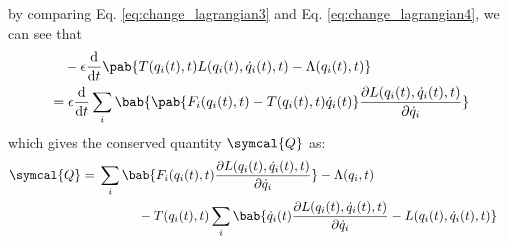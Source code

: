 by comparing Eq. \eqref{eq:change_lagrangian3} and Eq. \eqref{eq:change_lagrangian4}, we can see that
\begin{align}
   & \quad - \epsilon \odv{}{t} \pab{
    T(q_i(t), t)  L(q_i(t), \dot{q}_i(t), t)
    - \Lambda(q_i(t), t)
  \vphantom{\frac{a}{b}}}              \\
   & = \epsilon \odv{}{t} \sum_i \bab{
    \pab{
      F_i(q_i(t), t) -  T(q_i(t), t) \dot{q}_i(t) \vphantom{\frac{a}{b}}
    } \pdv{L(q_i(t), \dot{q}_i(t), t)}{\dot{q}_i}
  }
\end{align}
which gives the conserved quantity $\symcal{Q}$ as:
\begin{align}
  \symcal{Q} & =
  \begin{multlined}[t]
    \sum_i \bab{F_i(q_i(t), t) \pdv{L(q_i(t), \dot{q}_i(t), t)}{\dot{q}_i}} - \Lambda(q_i, t) \\
    \qquad - T(q_i(t), t) \sum_i \bab{\dot{q}_i (t)\pdv{L(q_i(t), \dot{q}_i(t), t)}{\dot{q}_i} - L(q_i(t), \dot{q}_i(t), t)}
  \end{multlined}
\end{align}